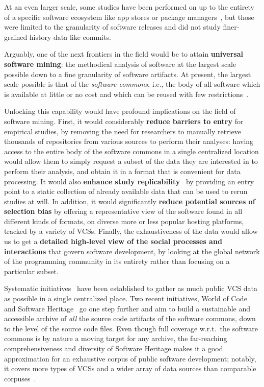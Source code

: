 At an even larger scale, some studies have been performed on up to the entirety
of a specific software ecosystem like app stores or package
managers~\cite{gonzalez2009macro,debsources-ese-2016}, but those were limited
to the granularity of software releases and did not study finer-grained history
data like commits.

Arguably, one of the next frontiers in the field would be to attain
\textbf{universal software mining}: the methodical analysis of software at
the largest scale possible down to a fine granularity of software artifacts.
At present, the largest scale possible is that of the \emph{software commons},
i.e., the body of all software which is available at little or no cost and
which can be reused with few
restrictions~\cite{1999-beagle-in-commons,kranich2008information}.

Unlocking this capability would have profound implications on the field of
software mining. First, it would considerably \textbf{reduce barriers to entry}
for empirical studies, by removing the need for researchers to manually
retrieve thousands of repositories from various sources to perform their
analyses: having access to the entire body of the software commons in a single
centralized location would allow them to simply request a subset of the data
they are interested in to perform their analysis, and obtain it in a format
that is convenient for data processing. It would also \textbf{enhance study
replicability}~\cite{Collberg2016,the-real-software-crisis,ferro2018sigir} by
providing an entry point to a static collection of already available data that
can be used to rerun studies at will.  In addition, it would significantly
\textbf{reduce potential sources of selection bias} by offering a
representative view of the software found in all different kinds of formats, on
diverse more or less popular hosting platforms, tracked by a variety of
\glspl{VCS}.  Finally, the exhaustiveness of the data would allow us to get a
\textbf{detailed high-level view of the social processes and interactions} that
govern software development, by looking at the global network of the
programming community in its entirety rather than focusing on a particular
subset.

Systematic initiatives~\cite{flossmole2006,gao2007archive,mockus2009}
have been established to gather as much public \gls{VCS} data as possible in a
single centralized place. Two recent initiatives, World of
Code~\cite{mockus2019woc} and Software Heritage~\cite{swhipres2017,
swhcacm2018} go one step further and aim to build a sustainable and accessible
archive of \emph{all} the source code artifacts of the software commons, down
to the level of the source code files. Even though full coverage w.r.t.\ the
software commons is by nature a moving target for any archive, the far-reaching
comprehensiveness and diversity of Software Heritage makes it a good
approximation for an exhaustive corpus of public software development; notably,
it covers more types of \glspl{VCS} and a wider array of data sources than
comparable corpuses~\cite{ma2021world}.

